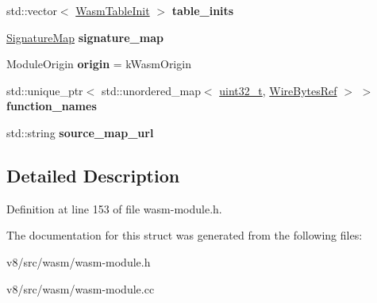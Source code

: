 \begin{DoxyCompactItemize}
\mbox{\label{structv8_1_1internal_1_1wasm_1_1WasmModule_ac4ac9fc7b0c47f3b6879065cd74278d7}} 
std\+::vector$<$ \mbox{\hyperlink{structv8_1_1internal_1_1wasm_1_1WasmTableInit}{Wasm\+Table\+Init}} $>$ {\bfseries table\+\_\+inits}
\item 
\mbox{\label{structv8_1_1internal_1_1wasm_1_1WasmModule_a40c66f7d86da5501b2767c4621274312}} 
\mbox{\hyperlink{classv8_1_1internal_1_1wasm_1_1SignatureMap}{Signature\+Map}} {\bfseries signature\+\_\+map}
\item 
\mbox{\label{structv8_1_1internal_1_1wasm_1_1WasmModule_ae8e4fe37215c077dc7bbeec494634c35}} 
Module\+Origin {\bfseries origin} = k\+Wasm\+Origin
\item 
\mbox{\label{structv8_1_1internal_1_1wasm_1_1WasmModule_ab8c818baf236e4cffe613350e4a9bc2a}} 
std\+::unique\+\_\+ptr$<$ std\+::unordered\+\_\+map$<$ \mbox{\hyperlink{classuint32__t}{uint32\+\_\+t}}, \mbox{\hyperlink{classv8_1_1internal_1_1wasm_1_1WireBytesRef}{Wire\+Bytes\+Ref}} $>$ $>$ {\bfseries function\+\_\+names}
\item 
\mbox{\label{structv8_1_1internal_1_1wasm_1_1WasmModule_a2bfc4a4d013eff8be50eb097b0516c00}} 
std\+::string {\bfseries source\+\_\+map\+\_\+url}
\end{DoxyCompactItemize}


\subsection{Detailed Description}


Definition at line 153 of file wasm-\/module.\+h.



The documentation for this struct was generated from the following files\+:\begin{DoxyCompactItemize}
\item 
v8/src/wasm/wasm-\/module.\+h\item 
v8/src/wasm/wasm-\/module.\+cc\end{DoxyCompactItemize}
